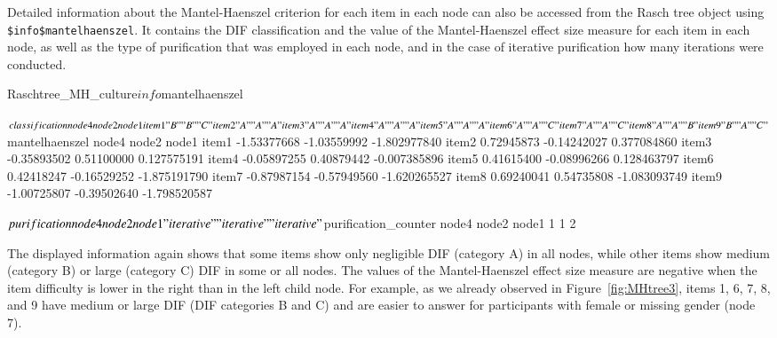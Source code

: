 \documentclass[doc,floatsintext,natbib]{apa7}
\begin{document}
Detailed information about the Mantel-Haenszel criterion for each item in each node can also be accessed from the Rasch tree object using \texttt{\$info\$mantelhaenszel}. It contains the DIF classification and the value of the Mantel-Haenszel effect size measure for each item in each node, as well as the type of purification that was employed in each node, and in the case of iterative purification how many iterations were conducted.

\begin{Schunk}
\begin{Sinput}
 Raschtree_MH_culture$info$mantelhaenszel
\end{Sinput}
\begin{Soutput}
$classification
      node4 node2 node1
item1 "B"   "B"   "C"  
item2 "A"   "A"   "A"  
item3 "A"   "A"   "A"  
item4 "A"   "A"   "A"  
item5 "A"   "A"   "A"  
item6 "A"   "A"   "C"  
item7 "A"   "A"   "C"  
item8 "A"   "A"   "B"  
item9 "B"   "A"   "C"  

$mantelhaenszel
            node4       node2        node1
item1 -1.53377668 -1.03559992 -1.802977840
item2  0.72945873 -0.14242027  0.377084860
item3 -0.35893502  0.51100000  0.127575191
item4 -0.05897255  0.40879442 -0.007385896
item5  0.41615400 -0.08996266  0.128463797
item6  0.42418247 -0.16529252 -1.875191790
item7 -0.87987154 -0.57949560 -1.620265527
item8  0.69240041  0.54735808 -1.083093749
item9 -1.00725807 -0.39502640 -1.798520587

$purification
      node4       node2       node1 
"iterative" "iterative" "iterative" 

$purification_counter
node4 node2 node1 
    1     1     2 
\end{Soutput}
\end{Schunk}

The displayed information again shows that some items show only negligible DIF (category A) in all nodes, while other items show medium (category B) or large (category C) DIF in some or all nodes. The values of the Mantel-Haenszel effect size measure are negative when the item difficulty is lower in the right than in the left child node. For example, as we already observed in Figure~\ref{fig:MHtree3}, items 1, 6, 7, 8, and 9 have medium or large DIF (DIF categories B and C) and are  easier to answer %
for participants with female or missing gender (node 7). %
\end{document}
